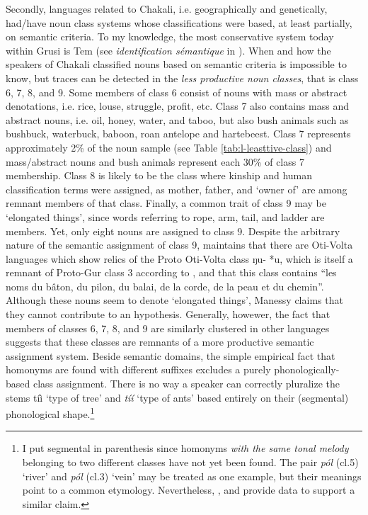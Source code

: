 \begin{exe}
\begin{exe}
\begin{exe}
{\begin{exe}
\begin{exe}
\begin{exe}
\begin{exe}
Secondly, languages related to Chakali, i.e. geographically and genetically,  
had/have noun class systems whose classifications were based, at least 
partially, on semantic criteria. To my knowledge, the most conservative system 
today  within Grusi is Tem (see {\it identification sémantique} in 
\citet{Tcha07}). When and how the speakers of Chakali  classified nouns based on 
semantic criteria is impossible to know,  but traces can be detected in  the   
{\it less productive noun classes}, that is class 6, 7, 8, and 9. Some members 
of class 6 consist of nouns with mass or abstract  denotations, i.e. rice,  
louse, struggle, profit, etc.  Class 7 also contains mass and abstract nouns, 
i.e. oil,  honey, water, and taboo, but also bush animals such as bushbuck, 
waterbuck, baboon, roan antelope and hartebeest. Class 7 represents 
approximately 2\% of the noun sample (see Table \ref{tab:l-leasttive-class}) and 
 mass/abstract nouns and bush animals represent each  30\% of class 7 
membership. Class 8 is likely to be the class where kinship and human 
classification terms were assigned, as mother, father, and `owner of' are among 
remnant members of that class.  Finally, a  common trait of class 9 may be 
`elongated things', since words referring to  rope, arm, tail, and ladder are 
members. Yet, only eight nouns are assigned to class 9. Despite the arbitrary 
nature of the semantic assignment of class 9,  \citet[94]{Mane75} maintains that 
there are Oti-Volta languages which show relics of  the Proto Oti-Volta class 
{\sls *ŋu- *u}, which is  itself a remnant of Proto-Gur class 3   according to 
\citet[11]{Mieh07}, and that this class contains ``les noms du bâton, du pilon, 
du balai, de la corde, de la peau et du chemin''.  Although these nouns seem to 
denote `elongated  things',   Manessy claims that they cannot contribute to an 
hypothesis. Generally, howewer, the fact that members of classes 6, 7, 8, and 9 
are similarly clustered in other languages suggests that these classes are 
remnants of a more productive semantic assignment system. Beside semantic 
domains, the simple empirical fact that homonyms are found with different 
suffixes excludes a purely phonologically-based class assignment. There is no 
way a speaker can correctly pluralize the stems {\sls tíì} `type of tree' and 
{\it tíí} `type of ants' based entirely on their (segmental) phonological 
shape.\footnote{I put segmental in parenthesis since  homonyms {\it with the 
same tonal melody} belonging to two different classes have not yet been  found. 
The pair {\it pól} ({\sc cl.5}) `river' and {\it pól} ({\sc cl.3}) `vein' may 
be treated as one example, but their meanings point to a common etymology. 
Nevertheless, \citet{Bonv88}, \citet{Awed07} and \citet{Tcha07} provide data to 
support a similar claim.} 


\end{exe}
\end{exe}
\end{exe}
\end{exe}}
\end{exe}
\end{exe}
\end{exe}
